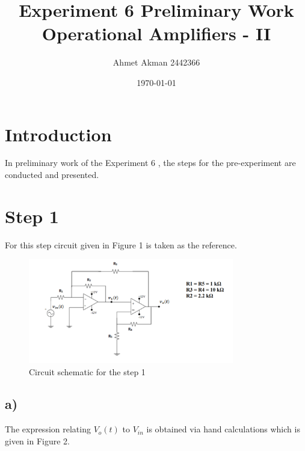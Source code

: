 \documentclass[letterpaper,12pt]{article}
\begin{document}
\title{Experiment 6 Preliminary Work \protect\\ Operational Amplifiers - II}
\author{Ahmet Akman 2442366 \protect\\}
\date{\today}
\maketitle


\section{Introduction} 
In preliminary work of the Experiment 6 , the steps for the pre-experiment are conducted and presented.
\section{Step 1}
For this step circuit given in Figure 1 is taken as the reference.
\begin{figure}[H]
	\centering
   \includegraphics[width=0.8\textwidth]{circuit_1.png}
   \caption{Circuit schematic for the step 1}
\end{figure} 

\subsection{a)}
The expression relating \(V_o(t)\) to \(V_{in}\) is obtained via hand calculations which is given in Figure 2.
\end{document}
